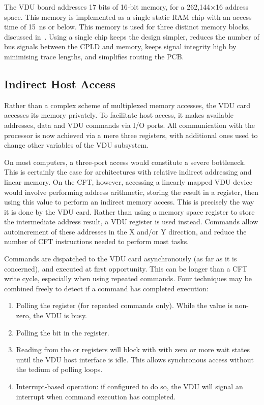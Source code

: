 The VDU board addresses 17 bits of 16-bit memory, for a 262,144×16 address
space. This memory is implemented as a single static RAM chip with an access
time of 15~ns or below. This memory is used for three distinct memory blocks,
discussed in~. Using a single chip keeps the design
simpler, reduces the number of bus signals between the CPLD and memory, keeps
signal integrity high by minimising trace lengths, and simplifies routing the
PCB.

\subsection{Indirect Host Access}

Rather than a complex scheme of multiplexed memory accesses, the VDU card
accesses its memory privately. To facilitate host access, it makes available
addresses, data and VDU commands via I/O ports. All communication with the
processor is now achieved via a mere three registers, with additional ones used
to change other variables of the VDU subsystem.

On most computers, a three-port access would constitute a severe
bottleneck. This is certainly the case for architectures with relative indirect
addressing and linear memory. On the CFT, however, accessing a linearly mapped
VDU device would involve performing address arithmetic, storing the result in a
register, then using this value to perform an indirect memory access. This is
precisely the way it is done by the VDU card. Rather than using a memory space
register to store the intermediate address result, a VDU register is used
instead. Commands allow autoincrement of these addresses in the X and/or Y
direction, and reduce the number of CFT instructions needed to perform most
tasks.

Commands are dispatched to the VDU card asynchronously (as far as it is
concerned), and executed at first opportunity. This can be longer than a CFT
write cycle, especially when using repeated commands. Four techniques may be
combined freely to detect if a command has completed execution:

\begin{enumerate}
\item Polling the  register (for repeated commands only). While the
  value is non-zero, the VDU is busy.
\item Polling the  bit in the  register.
\item Reading from the  or  registers will block with
  with zero or more wait states until the VDU host interface is idle. This
  allows synchronous access without the tedium of polling loops.
\item Interrupt-based operation: if configured to do so, the VDU will signal an
  interrupt when command execution has completed.
\end{enumerate}

